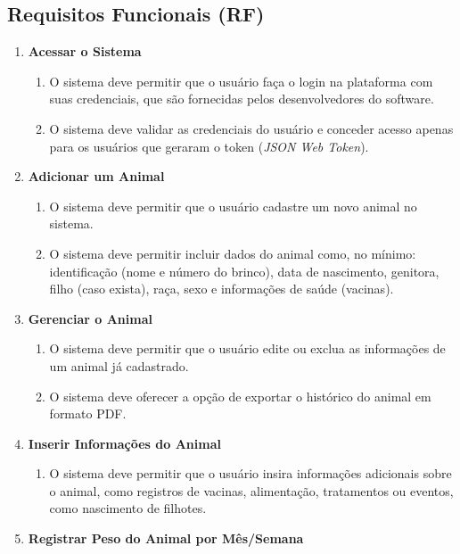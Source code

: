 \documentclass[12pt, a4paper]{article}
\begin{document}
\begin{spacing}{1.5}
\subsection{Requisitos Funcionais (RF)}
\begin{spacing}{1.5}
\begin{enumerate}[label=RF0\arabic{*}.]
    \item \textbf{Acessar o Sistema}
    \begin{enumerate}[label=RF01.0\arabic{*}]
        \item O sistema deve permitir que o usuário faça o login na plataforma com suas credenciais, que são fornecidas pelos desenvolvedores do software.
        \item O sistema deve validar as credenciais do usuário e conceder acesso apenas para os usuários que geraram o token (\textit{JSON Web Token}).
    \end{enumerate}
    \item \textbf{Adicionar um Animal}
    \begin{enumerate}[label=RF02.0\arabic{*}]
        \item O sistema deve permitir que o usuário cadastre um novo animal no sistema.
        \item O sistema deve permitir incluir dados do animal como, no mínimo: identificação (nome e número do brinco), data de nascimento, genitora, filho (caso exista), raça, sexo e informações de saúde (vacinas).
    \end{enumerate}
    \item \textbf{Gerenciar o Animal}
    \begin{enumerate}[label=RF03.0\arabic{*}]
        \item O sistema deve permitir que o usuário edite ou exclua as informações de um animal já cadastrado.
        \item O sistema deve oferecer a opção de exportar o histórico do animal em formato PDF.
    \end{enumerate}
    \item \textbf{Inserir Informações do Animal}
    \begin{enumerate}[label=RF04.0\arabic{*}]
        \item O sistema deve permitir que o usuário insira informações adicionais sobre o animal, como registros de vacinas, alimentação, tratamentos ou eventos, como nascimento de filhotes.
    \end{enumerate}
    \item \textbf{Registrar Peso do Animal por Mês/Semana}

\end{enumerate}
\end{spacing}
\end{spacing}
\end{document}
